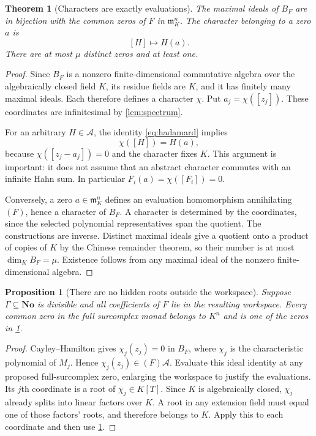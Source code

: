 \documentclass[11pt,letterpaper]{article}
\newtheorem{theorem}{Theorem}[section]
\newtheorem{proposition}[proposition]{Proposition}
\theoremstyle{definition}
\theoremstyle{remark}
\newcommand{\No}{\mathbf{No}}
\newcommand{\A}{\mathscr A}
\newcommand{\mm}{\mathfrak m}
\numberwithin{equation}{section}
\begin{document}
\begin{theorem}[Characters are exactly evaluations]\label{thm:characters}
The maximal ideals of $B_F$ are in bijection with the common zeros of $F$ in $\mm_K^n$. The character belonging to a zero $a$ is
\[
 [H]\longmapsto H(a).
\]
There are at most $\mu$ distinct zeros and at least one.
\end{theorem}
\begin{proof}
Since $B_F$ is a nonzero finite-dimensional commutative algebra over the algebraically closed field $K$, its residue fields are $K$, and it has finitely many maximal ideals. Each therefore defines a character $\chi$. Put $a_j=\chi([z_j])$. These coordinates are infinitesimal by \cref{lem:spectrum}.

For an arbitrary $H\in\A$, the identity \eqref{eq:hadamard} implies
\[
 \chi([H])=H(a),
\]
because $\chi([z_j-a_j])=0$ and the character fixes $K$. This argument is important: it does not assume that an abstract character commutes with an infinite Hahn sum. In particular $F_i(a)=\chi([F_i])=0$.

Conversely, a zero $a\in\mm_K^n$ defines an evaluation homomorphism annihilating $(F)$, hence a character of $B_F$. A character is determined by the coordinates, since the selected polynomial representatives span the quotient. The constructions are inverse. Distinct maximal ideals give a quotient onto a product of copies of $K$ by the Chinese remainder theorem, so their number is at most $\dim_K B_F=\mu$. Existence follows from any maximal ideal of the nonzero finite-dimensional algebra.
\end{proof}

\begin{proposition}[There are no hidden roots outside the workspace]\label{prop:nohidden}
Suppose $\Gamma\subseteq\No$ is divisible and all coefficients of $F$ lie in the resulting workspace. Every common zero in the full surcomplex monad belongs to $K^n$ and is one of the zeros in \cref{thm:characters}.
\end{proposition}
\begin{proof}
Cayley--Hamilton gives $\chi_j(z_j)=0$ in $B_F$, where $\chi_j$ is the characteristic polynomial of $M_j$. Hence $\chi_j(z_j)\in(F)\A$. Evaluate this ideal identity at any proposed full-surcomplex zero, enlarging the workspace to justify the evaluations. Its $j$th coordinate is a root of $\chi_j\in K[T]$. Since $K$ is algebraically closed, $\chi_j$ already splits into linear factors over $K$. A root in any extension field must equal one of those factors' roots, and therefore belongs to $K$. Apply this to each coordinate and then use \cref{thm:characters}.
\end{proof}
\end{document}
